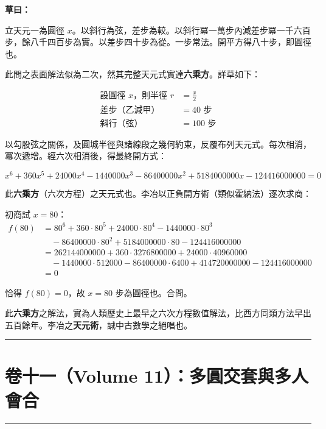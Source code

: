 \documentclass[11pt,a4paper]{article}
\newcommand{\longline}{\noindent\rule{\textwidth}{0.4pt}}
\newcommand{\caoyue}[1]{\par\noindent\textbf{草曰：}{#1}\par}
\begin{document}
\caoyue{
立天元一為圓徑 $x$。以斜行為弦，差步為較。以斜行冪一萬步內減差步冪一千六百步，餘八千四百步為實。以差步四十步為從。一步常法。開平方得八十步，即圓徑也。

此問之表面解法似為二次，然其完整天元式實達\textbf{六乘方}。詳草如下：

\begin{align*}
\text{設圓徑 } x \text{，則半徑 } r &= \frac{x}{2} \\
\text{差步（乙減甲）} &= 40 \text{ 步} \\
\text{斜行（弦）} &= 100 \text{ 步}
\end{align*}

以勾股弦之關係，及圓城半徑與諸線段之幾何約束，反覆布列天元式。每次相消，冪次遞增。經六次相消後，得最終開方式：

$$x^6 + 360x^5 + 24000x^4 - 1440000x^3 - 86400000x^2 + 5184000000x - 124416000000 = 0$$

此\textbf{六乘方}（六次方程）之天元式也。李冶以正負開方術（類似霍納法）逐次求商：

初商試 $x = 80$：
\begin{align*}
f(80) &= 80^6 + 360 \cdot 80^5 + 24000 \cdot 80^4 - 1440000 \cdot 80^3 \\
&\quad - 86400000 \cdot 80^2 + 5184000000 \cdot 80 - 124416000000 \\
&= 262144000000 + 360 \cdot 3276800000 + 24000 \cdot 40960000 \\
&\quad - 1440000 \cdot 512000 - 86400000 \cdot 6400 + 414720000000 - 124416000000 \\
&= 0
\end{align*}

恰得 $f(80) = 0$，故 $x = 80$ 步為圓徑也。合問。

此\textbf{六乘方}之解法，實為人類歷史上最早之六次方程數值解法，比西方同類方法早出五百餘年。李冶之\textbf{天元術}，誠中古數學之絕唱也。
}

\vspace{0.5cm}
\longline

\newpage

\section{卷十一（Volume 11）：多圓交套與多人會合}
\label{sec:vol11}

\longline
\end{document}
